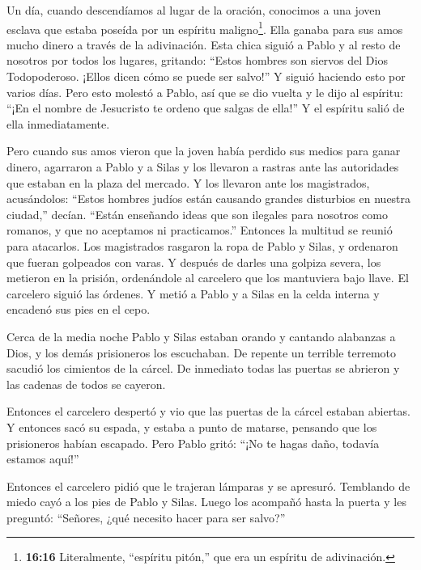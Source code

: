  Un día, cuando descendíamos al lugar de la oración,
conocimos a una joven esclava que estaba poseída por un espíritu
maligno\footnote{\textbf{16:16} Literalmente, ``espíritu pitón,'' que
  era un espíritu de adivinación.}. Ella ganaba para sus amos mucho
dinero a través de la adivinación.  Esta chica siguió a
Pablo y al resto de nosotros por todos los lugares, gritando: ``Estos
hombres son siervos del Dios Todopoderoso. ¡Ellos dicen cómo se puede
ser salvo!''  Y siguió haciendo esto por varios días. Pero
esto molestó a Pablo, así que se dio vuelta y le dijo al espíritu: ``¡En
el nombre de Jesucristo te ordeno que salgas de ella!'' Y el espíritu
salió de ella inmediatamente.

 Pero cuando sus amos vieron que la joven había perdido sus
medios para ganar dinero, agarraron a Pablo y a Silas y los llevaron a
rastras ante las autoridades que estaban en la plaza del mercado.
 Y los llevaron ante los magistrados, acusándolos: ``Estos
hombres judíos están causando grandes disturbios en nuestra ciudad,''
decían.  ``Están enseñando ideas que son ilegales para
nosotros como romanos, y que no aceptamos ni practicamos.''
 Entonces la multitud se reunió para atacarlos. Los
magistrados rasgaron la ropa de Pablo y Silas, y ordenaron que fueran
golpeados con varas.  Y después de darles una golpiza
severa, los metieron en la prisión, ordenándole al carcelero que los
mantuviera bajo llave.  El carcelero siguió las órdenes. Y
metió a Pablo y a Silas en la celda interna y encadenó sus pies en el
cepo.

 Cerca de la media noche Pablo y Silas estaban orando y
cantando alabanzas a Dios, y los demás prisioneros los escuchaban.
 De repente un terrible terremoto sacudió los cimientos de
la cárcel. De inmediato todas las puertas se abrieron y las cadenas de
todos se cayeron.

 Entonces el carcelero despertó y vio que las puertas de la
cárcel estaban abiertas. Y entonces sacó su espada, y estaba a punto de
matarse, pensando que los prisioneros habían escapado. 
Pero Pablo gritó: ``¡No te hagas daño, todavía estamos aquí!''

 Entonces el carcelero pidió que le trajeran lámparas y se
apresuró. Temblando de miedo cayó a los pies de Pablo y Silas.
 Luego los acompañó hasta la puerta y les preguntó:
``Señores, ¿qué necesito hacer para ser salvo?''

